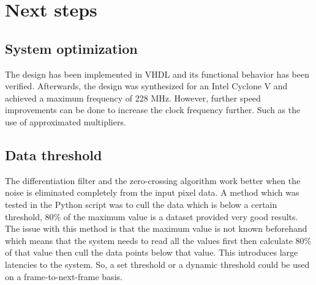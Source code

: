 \section{Next steps}
\subsection{System optimization}

The design has been implemented in VHDL and its functional behavior has been verified. Afterwards, the design was synthesized for an Intel Cyclone V and achieved a maximum frequency of 228 MHz. However, further speed improvements can be done to increase the clock frequency further. Such as the use of approximated multipliers.

\subsection{Data threshold}

The differentiation filter and the zero-crossing algorithm work better when the noise is eliminated completely from the input pixel data. A method which was tested in the Python script was to cull the data which is below a certain threshold, 80\% of the maximum value is a dataset provided very good results. The issue with this method is that the maximum value is not known beforehand which means that the system needs to read all the values first then calculate 80\% of that value then cull the data points below that value. This introduces large latencies to the system. So, a set threshold or a dynamic threshold could be used on a frame-to-next-frame basis.
